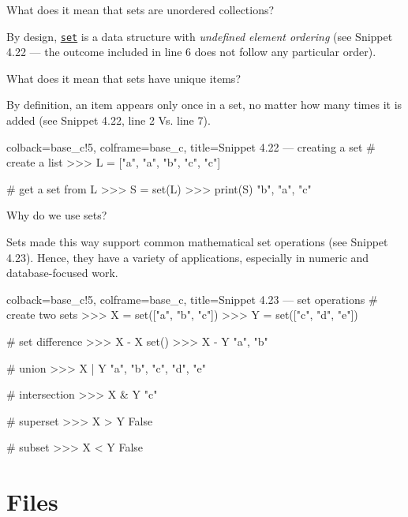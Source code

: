 \documentclass[a4paper,11pt]{book}
\numberwithin{figure}{chapter}
\numberwithin{table}{chapter}
\newcommand{\question}[1]{%
    \begin{tcolorbox}[colback=comp_c!10,colframe=comp_c,sidebyside align=top,width=\linewidth,before skip=1ex]
        #1
    \end{tcolorbox}
    \switchcolumn%
}
\newcommand{\note}[1]{%
    \begin{tcolorbox}[colback=white!0,colframe=white!10,width=\linewidth,before skip=1ex]
        #1
    \end{tcolorbox}
}
\begin{document}
\begin{paracol}{2}
	\question{\raggedright What does it mean that sets are unordered collections?}
	\note{By design, \href{https://docs.python.org/3/tutorial/datastructures.html\#sets}{\texttt{set}} is a data structure with \emph{undefined element ordering} (see Snippet 4.22 --- the outcome included in line 6 does not follow any particular order).}
\end{paracol}

\begin{paracol}{2}
	\question{\raggedright What does it mean that sets have unique items?}
	\note{By definition, an item appears only once in a set, no matter how many times it is added (see Snippet 4.22, line 2 Vs. line 7).}
\end{paracol}

\clearpage

\begin{pythoncode}[linenos=true,]{colback=base_c!5, colframe=base_c, title=\sffamily Snippet 4.22 --- creating a set}
# create a list
>>> L = ["a", "a", "b", "c", "c"]

# get a set from L
>>> S = set(L)
>>> print(S)
{"b", "a", "c"}
\end{pythoncode}

\begin{paracol}{2}
	\question{\raggedright Why do we use sets?}
	\note{Sets made this way support common mathematical set operations (see Snippet 4.23). Hence, they have a variety of applications, especially in numeric and database-focused work. }
\end{paracol}

\begin{pythoncode}[linenos=true,]{colback=base_c!5, colframe=base_c, title=\sffamily Snippet 4.23 --- set operations}
# create two sets 
>>> X = set(["a", "b", "c"])
>>> Y = set(["c", "d", "e"])

# set difference 
>>> X - X
set()
>>> X - Y
{"a", "b"}

# union
>>> X | Y
{"a", "b", "c", "d", "e"}

# intersection
>>> X & Y
{"c"}

# superset
>>> X > Y
False

# subset
>>> X < Y
False
\end{pythoncode}
\clearpage

\section{Files}
\end{document}
